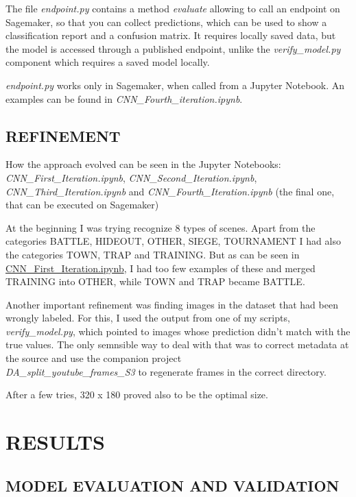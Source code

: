 \documentclass[
]{article}
\begin{document}
The file \emph{endpoint.py} contains a method \emph{evaluate} allowing
to call an endpoint on Sagemaker, so that you can collect predictions,
which can be used to show a classification report and a confusion
matrix. It requires locally saved data, but the model is accessed
through a published endpoint, unlike the \emph{verify\_model.py}
component which requires a saved model locally.

\emph{endpoint.py} works only in Sagemaker, when called from a Jupyter
Notebook. An examples can be found in
\emph{CNN\_Fourth\_iteration.ipynb}.


\hypertarget{refinement}{%
\subsection{REFINEMENT}\label{refinement}}

How the approach evolved can be seen in the Jupyter Notebooks:  \emph{CNN\_First\_Iteration.ipynb}, \emph{CNN\_Second\_Iteration.ipynb},  \emph{CNN\_Third\_Iteration.ipynb} and \emph{CNN\_Fourth\_Iteration.ipynb} (the final one, that can be executed on Sagemaker)

At the beginning I was trying recognize 8 types of scenes. Apart from
the categories BATTLE, HIDEOUT, OTHER, SIEGE, TOURNAMENT I had also the
categories TOWN, TRAP and TRAINING. But as can be seen in
\url{CNN_First_Iteration.ipynb}, I had too few examples of these and
merged TRAINING into OTHER, while TOWN and TRAP became BATTLE.

Another important refinement was finding images in the dataset that had
been wrongly labeled. For this, I used the output from one of my
scripts, \emph{verify\_model.py}, which pointed to images whose
prediction didn't match with the true values. The only semnsible way to deal with
that was to correct metadata at the source and use the companion
project\\
\emph{DA\_split\_youtube\_frames\_S3} to regenerate frames in the
correct directory.

After a few tries, 320 x 180 proved also to be the optimal size.

\hypertarget{results}{%
\section{RESULTS}\label{results}}

\hypertarget{model-evaluation-and-validation}{%
\subsection{MODEL EVALUATION AND
VALIDATION}\label{model-evaluation-and-validation}}
\end{document}
